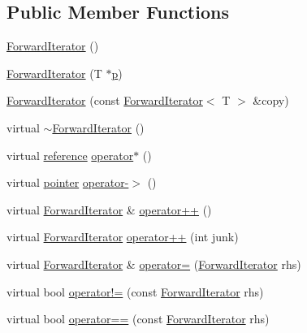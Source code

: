 \subsection*{Public Member Functions}
\begin{DoxyCompactItemize}
\item 
\hyperlink{classprism_1_1containers_1_1_forward_iterator_a7852817d50449b2ab5fc73f071c10c8d}{Forward\+Iterator} ()
\item 
\hyperlink{classprism_1_1containers_1_1_forward_iterator_a469936218cb7f00b04d13340afeff943}{Forward\+Iterator} (T $\ast$\hyperlink{classprism_1_1containers_1_1_forward_iterator_afae3bf32acc98ab535b9bdb8156ba58f}{p})
\item 
\hyperlink{classprism_1_1containers_1_1_forward_iterator_a6b7c7a4d1ff9c119826689fd75f8037e}{Forward\+Iterator} (const \hyperlink{classprism_1_1containers_1_1_forward_iterator}{Forward\+Iterator}$<$ T $>$ \&copy)
\item 
virtual \hyperlink{classprism_1_1containers_1_1_forward_iterator_afb9d08367d5a03fcaca4524f799b702c}{$\sim$\+Forward\+Iterator} ()
\item 
virtual \hyperlink{classprism_1_1containers_1_1_forward_iterator_a4e3141e23f97c87d787c42e5e25cfdf8}{reference} \hyperlink{classprism_1_1containers_1_1_forward_iterator_a4bb697c101c3430ab83380e93984c834}{operator$\ast$} ()
\item 
virtual \hyperlink{classprism_1_1containers_1_1_forward_iterator_ad4bc81f412acc7a2d12e592078ed51aa}{pointer} \hyperlink{classprism_1_1containers_1_1_forward_iterator_a6de6139a20b187db48db7eda3e137d22}{operator-\/$>$} ()
\item 
virtual \hyperlink{classprism_1_1containers_1_1_forward_iterator}{Forward\+Iterator} \& \hyperlink{classprism_1_1containers_1_1_forward_iterator_a650b575bab2dd1f9b20e2a0feb3b8b52}{operator++} ()
\item 
virtual \hyperlink{classprism_1_1containers_1_1_forward_iterator}{Forward\+Iterator} \hyperlink{classprism_1_1containers_1_1_forward_iterator_a52c1a971cf72b2a085defacd771e6c6e}{operator++} (int junk)
\item 
virtual \hyperlink{classprism_1_1containers_1_1_forward_iterator}{Forward\+Iterator} \& \hyperlink{classprism_1_1containers_1_1_forward_iterator_a21a1aaeb388a2d31a750629c3dec4f5c}{operator=} (\hyperlink{classprism_1_1containers_1_1_forward_iterator}{Forward\+Iterator} rhs)
\item 
virtual bool \hyperlink{classprism_1_1containers_1_1_forward_iterator_a4f58dc3e4905d6ac25b5c4c02ab1477e}{operator!=} (const \hyperlink{classprism_1_1containers_1_1_forward_iterator}{Forward\+Iterator} rhs)
\item 
virtual bool \hyperlink{classprism_1_1containers_1_1_forward_iterator_a6b9425598a719eb264beffe220acbfc8}{operator==} (const \hyperlink{classprism_1_1containers_1_1_forward_iterator}{Forward\+Iterator} rhs)
\end{DoxyCompactItemize}

